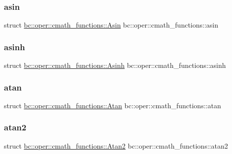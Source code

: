 \subsubsection{\texorpdfstring{asin}{asin}}
{\footnotesize\ttfamily struct \hyperlink{structbc_1_1oper_1_1cmath__functions_1_1Asin}{bc\+::oper\+::cmath\+\_\+functions\+::\+Asin}   bc\+::oper\+::cmath\+\_\+functions\+::asin}

\mbox{\label{namespacebc_1_1oper_1_1cmath__functions_a2283701ea1faf422cbfe823eab8754f6}} 
\subsubsection{\texorpdfstring{asinh}{asinh}}
{\footnotesize\ttfamily struct \hyperlink{structbc_1_1oper_1_1cmath__functions_1_1Asinh}{bc\+::oper\+::cmath\+\_\+functions\+::\+Asinh}   bc\+::oper\+::cmath\+\_\+functions\+::asinh}

\mbox{\label{namespacebc_1_1oper_1_1cmath__functions_a052553661cbe5695eb57d1ae0e5ab5d5}} 
\subsubsection{\texorpdfstring{atan}{atan}}
{\footnotesize\ttfamily struct \hyperlink{structbc_1_1oper_1_1cmath__functions_1_1Atan}{bc\+::oper\+::cmath\+\_\+functions\+::\+Atan}   bc\+::oper\+::cmath\+\_\+functions\+::atan}

\mbox{\label{namespacebc_1_1oper_1_1cmath__functions_a2ac198569ed3efd56613aa26fad1d0ba}} 
\subsubsection{\texorpdfstring{atan2}{atan2}}
{\footnotesize\ttfamily struct \hyperlink{structbc_1_1oper_1_1cmath__functions_1_1Atan2}{bc\+::oper\+::cmath\+\_\+functions\+::\+Atan2}   bc\+::oper\+::cmath\+\_\+functions\+::atan2}

